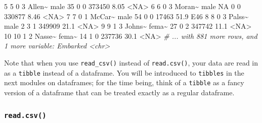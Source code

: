 \documentclass[
]{book}
\newenvironment{Shaded}{\begin{snugshade}}{\end{snugshade}}
\newcommand{\CommentTok}[1]{\textcolor[rgb]{0.56,0.35,0.01}{\textit{#1}}}
\newcommand{\ConstantTok}[1]{\textcolor[rgb]{0.00,0.00,0.00}{#1}}
\newcommand{\DecValTok}[1]{\textcolor[rgb]{0.00,0.00,0.81}{#1}}
\newcommand{\FloatTok}[1]{\textcolor[rgb]{0.00,0.00,0.81}{#1}}
\newcommand{\NormalTok}[1]{#1}
\newcommand{\SpecialCharTok}[1]{\textcolor[rgb]{0.00,0.00,0.00}{#1}}
\begin{document}
\begin{Shaded}
\begin{Highlighting}[]
 \DecValTok{5}           \DecValTok{5}        \DecValTok{0}      \DecValTok{3}\NormalTok{ Allen}\SpecialCharTok{\textasciitilde{}}\NormalTok{ male     }\DecValTok{35}     \DecValTok{0}     \DecValTok{0} \DecValTok{373450}  \FloatTok{8.05} \SpecialCharTok{\textless{}}\ConstantTok{NA}\SpecialCharTok{\textgreater{}} 
 \DecValTok{6}           \DecValTok{6}        \DecValTok{0}      \DecValTok{3}\NormalTok{ Moran}\SpecialCharTok{\textasciitilde{}}\NormalTok{ male     }\ConstantTok{NA}     \DecValTok{0}     \DecValTok{0} \DecValTok{330877}  \FloatTok{8.46} \SpecialCharTok{\textless{}}\ConstantTok{NA}\SpecialCharTok{\textgreater{}} 
 \DecValTok{7}           \DecValTok{7}        \DecValTok{0}      \DecValTok{1}\NormalTok{ McCar}\SpecialCharTok{\textasciitilde{}}\NormalTok{ male     }\DecValTok{54}     \DecValTok{0}     \DecValTok{0} \DecValTok{17463}  \FloatTok{51.9}\NormalTok{  E46  }
 \DecValTok{8}           \DecValTok{8}        \DecValTok{0}      \DecValTok{3}\NormalTok{ Palss}\SpecialCharTok{\textasciitilde{}}\NormalTok{ male      }\DecValTok{2}     \DecValTok{3}     \DecValTok{1} \DecValTok{349909} \FloatTok{21.1}  \SpecialCharTok{\textless{}}\ConstantTok{NA}\SpecialCharTok{\textgreater{}} 
 \DecValTok{9}           \DecValTok{9}        \DecValTok{1}      \DecValTok{3}\NormalTok{ Johns}\SpecialCharTok{\textasciitilde{}}\NormalTok{ fema}\SpecialCharTok{\textasciitilde{}}    \DecValTok{27}     \DecValTok{0}     \DecValTok{2} \DecValTok{347742} \FloatTok{11.1}  \SpecialCharTok{\textless{}}\ConstantTok{NA}\SpecialCharTok{\textgreater{}} 
\DecValTok{10}          \DecValTok{10}        \DecValTok{1}      \DecValTok{2}\NormalTok{ Nasse}\SpecialCharTok{\textasciitilde{}}\NormalTok{ fema}\SpecialCharTok{\textasciitilde{}}    \DecValTok{14}     \DecValTok{1}     \DecValTok{0} \DecValTok{237736} \FloatTok{30.1}  \SpecialCharTok{\textless{}}\ConstantTok{NA}\SpecialCharTok{\textgreater{}} 
\CommentTok{\# ... with 881 more rows, and 1 more variable: Embarked \textless{}chr\textgreater{}}
\end{Highlighting}
\end{Shaded}

Note that when you use \texttt{read\_csv()} instead of \texttt{read.csv()}, your data are read in as a \texttt{tibble} instead of a dataframe. You will be introduced to \texttt{tibbles} in the next modules on dataframes; for the time being, think of a \texttt{tibble} as a fancy version of a dataframe that can be treated exactly as a regular dataframe.

\hypertarget{read.csv}{%
\subsubsection*{\texorpdfstring{\texttt{read.csv()}}{read.csv()}}\label{read.csv}}
\end{document}
